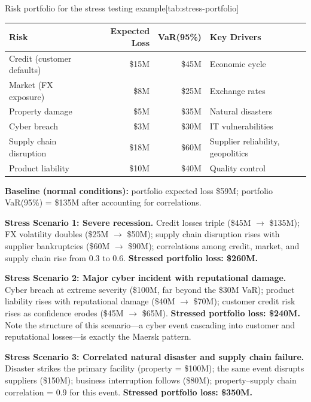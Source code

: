 \documentclass[11pt,openany]{book}
\begin{document}
\begin{ermtable}{Risk portfolio for the stress testing example}[tab:stress-portfolio]
\begin{tabularx}{\textwidth}{@{}lrrY@{}}
\toprule
\textbf{Risk} & \textbf{Expected Loss} & \textbf{VaR(95\%)} &
\textbf{Key Drivers} \\
\midrule
Credit (customer defaults) & \$15M & \$45M & Economic cycle \\
Market (FX exposure)       & \$8M  & \$25M & Exchange rates \\
Property damage            & \$5M  & \$35M & Natural disasters \\
Cyber breach               & \$3M  & \$30M & IT vulnerabilities \\
Supply chain disruption    & \$18M & \$60M & Supplier reliability, geopolitics \\
Product liability          & \$10M & \$40M & Quality control \\
\bottomrule
\end{tabularx}
\end{ermtable}

\textbf{Baseline (normal conditions):} portfolio expected loss \$59M;
portfolio VaR(95\%) = \$135M after accounting for correlations.

\textbf{Stress Scenario 1: Severe recession.} Credit losses triple (\$45M
\(\rightarrow\) \$135M); FX volatility doubles (\$25M \(\rightarrow\) \$50M);
supply chain disruption rises with supplier bankruptcies (\$60M
\(\rightarrow\) \$90M); correlations among credit, market, and supply chain
rise from 0.3 to 0.6. \textbf{Stressed portfolio loss: \$260M.}

\textbf{Stress Scenario 2: Major cyber incident with reputational damage.}
Cyber breach at extreme severity (\$100M, far beyond the \$30M VaR); product
liability rises with reputational damage (\$40M \(\rightarrow\) \$70M);
customer credit risk rises as confidence erodes (\$45M \(\rightarrow\) \$65M).
\textbf{Stressed portfolio loss: \$240M.} Note the structure of this
scenario---a cyber event cascading into customer and reputational losses---is
exactly the Maersk pattern.

\textbf{Stress Scenario 3: Correlated natural disaster and supply chain
failure.} Disaster strikes the primary facility (property = \$100M); the same
event disrupts suppliers (\$150M); business interruption follows (\$80M);
property--supply chain correlation = 0.9 for this event. \textbf{Stressed
portfolio loss: \$350M.}
\end{document}
